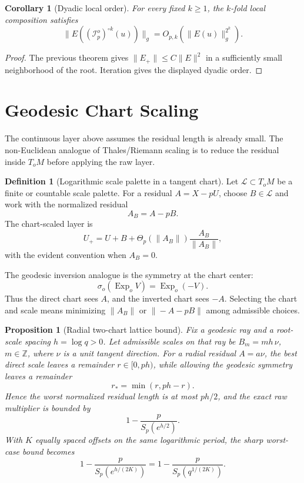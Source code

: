 \documentclass[10pt,a4paper]{article}
\theoremstyle{plain}
\newtheorem{proposition}[theorem]{Proposition}
\newtheorem{corollary}[theorem]{Corollary}
\theoremstyle{definition}
\newtheorem{definition}[theorem]{Definition}
\theoremstyle{remark}
\newcommand{\Exp}{\operatorname{Exp}}
\newcommand{\IRP}{\mathcal I}
\newcommand{\cL}{\mathcal L}
\begin{document}
\begin{corollary}[Dyadic local order]
For every fixed $k\ge1$, the $k$-fold local composition satisfies
\[
  \|E((\IRP_p^o)^{\circ k}(u))\|_g
    =O_{p,k}(\|E(u)\|_g^{2^k}).
\]
\end{corollary}

\begin{proof}
The previous theorem gives $\|E_+\|\le C\|E\|^2$ in a sufficiently small
neighborhood of the root.  Iteration gives the displayed dyadic order.
\end{proof}

\section{Geodesic Chart Scaling}

The continuous layer above assumes the residual length is already small.  The
non-Euclidean analogue of Thales/Riemann scaling is to reduce the residual
inside $T_oM$ before applying the raw layer.

\begin{definition}[Logarithmic scale palette in a tangent chart]
Let $\cL\subset T_oM$ be a finite or countable scale palette.  For a residual
$A=X-pU$, choose $B\in\cL$ and work with the normalized residual
\[
  A_B=A-pB.
\]
The chart-scaled layer is
\[
  U_+
    =U+B+\Theta_p(\|A_B\|)\frac{A_B}{\|A_B\|},
\]
with the evident convention when $A_B=0$.
\end{definition}

The geodesic inversion analogue is the symmetry at the chart center:
\[
  \sigma_o(\Exp_o V)=\Exp_o(-V).
\]
Thus the direct chart sees $A$, and the inverted chart sees $-A$.  Selecting the
chart and scale means minimizing $\|A_B\|$ or $\|-A-pB\|$ among admissible
choices.

\begin{proposition}[Radial two-chart lattice bound]
Fix a geodesic ray and a root-scale spacing $h=\log q>0$.  Let admissible scales
on that ray be $B_m=mh\,\nu$, $m\in\mathbb Z$, where $\nu$ is a unit tangent
direction.  For a radial residual $A=a\nu$, the best direct scale leaves a
remainder $r\in[0,ph)$, while allowing the geodesic symmetry leaves a remainder
\[
  r_*=\min(r,ph-r).
\]
Hence the worst normalized residual length is at most $ph/2$, and the exact raw
multiplier is bounded by
\[
  1-\frac{p}{S_p(e^{h/2})}.
\]
With $K$ equally spaced offsets on the same logarithmic period, the sharp
worst-case bound becomes
\[
  1-\frac{p}{S_p(e^{h/(2K)})}
  =
  1-\frac{p}{S_p(q^{1/(2K)})}.
\]
\end{proposition}
\end{document}

